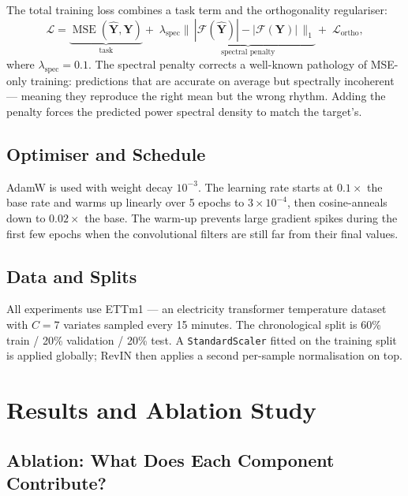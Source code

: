 \documentclass[11pt, letterpaper]{article}
\begin{document}
The total training loss combines a task term and the orthogonality regulariser:
\begin{equation}
  \mathcal{L} =
    \underbrace{\operatorname{MSE}(\hat{\mathbf{Y}},\mathbf{Y})}_{\text{task}}
    +\; \lambda_{\text{spec}}\underbrace{\bigl\|\,|\mathcal{F}(\hat{\mathbf{Y}})| -
    |\mathcal{F}(\mathbf{Y})|\,\bigr\|_1}_{\text{spectral penalty}}
    +\; \mathcal{L}_{\text{ortho}},
\end{equation}
where $\lambda_{\text{spec}} = 0.1$. The spectral penalty corrects a well-known pathology of
MSE-only training: predictions that are accurate on average but spectrally incoherent —
meaning they reproduce the right mean but the wrong rhythm. Adding the penalty forces the
predicted power spectral density to match the target's.

\subsection{Optimiser and Schedule}

AdamW is used with weight decay $10^{-3}$. The learning rate starts at $0.1\times$ the base
rate and warms up linearly over 5 epochs to $3\times10^{-4}$, then cosine-anneals down to
$0.02\times$ the base. The warm-up prevents large gradient spikes during the first few epochs
when the convolutional filters are still far from their final values.

\subsection{Data and Splits}

All experiments use ETTm1 — an electricity transformer temperature dataset with $C=7$
variates sampled every 15 minutes. The chronological split is 60\% train / 20\% validation /
20\% test. A \texttt{StandardScaler} fitted on the training split is applied globally;
RevIN then applies a second per-sample normalisation on top.

\section{Results and Ablation Study}
\label{sec:results}

\subsection{Ablation: What Does Each Component Contribute?}
\end{document}
